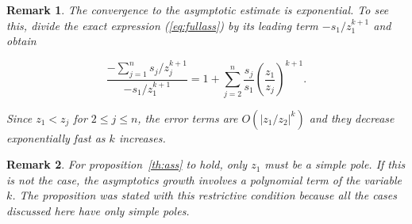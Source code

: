 \documentclass{article}
\newtheorem{remark}{Remark}
\begin{document}
\begin{remark}
The convergence to the asymptotic estimate is exponential. To see this,
divide the exact expression (\ref{eq:fullass}) by its leading term
$-s_1/z_1^{k+1}$ and obtain

\begin{equation*}
\frac{-\sum_{j=1}^n s_j/z_j^{k+1}}{-s_1/z_1^{k+1}} = 1 + \sum_{j=2}^n
\frac{s_j}{s_1} \left( \frac{z_1}{z_j} \right)^{k+1}.
\end{equation*}

Since $z_1 < z_j$ for $2 \leq j \leq n$, the error terms are
$O(|z_1/z_2|^k)$ and they decrease exponentially fast as $k$ increases.
\end{remark}

\begin{remark}
For proposition~\ref{th:ass} to hold, only $z_1$ must be a simple pole. If
this is not the case, the asymptotics growth involves a polynomial term of
the variable $k$. The proposition was stated with this restrictive
condition because all the cases discussed here have only simple poles.
\end{remark}
\end{document}
